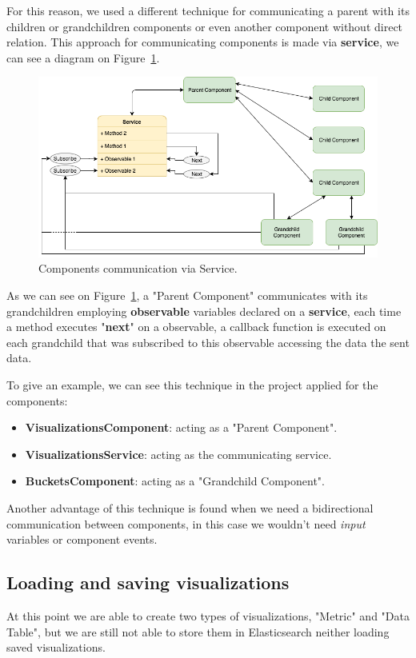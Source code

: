 \documentclass[a4paper, 12pt, english]{book}
\begin{document}
For this reason, we used a different technique for communicating a parent with its children or grandchildren components or even another component without direct relation. This approach for communicating components is made via \textbf{service}, we can see a diagram on Figure~\ref{fig:parent-child-via-service}.
\begin{figure}
  \centering
  \includegraphics[width=13cm, keepaspectratio]{img/parent-child-via-service.png}
  \caption{Components communication via Service.}
  \label{fig:parent-child-via-service}
\end{figure}

As we can see on Figure~\ref{fig:parent-child-via-service}, a "Parent Component" communicates with its grandchildren employing \textbf{observable} variables declared on a \textbf{service}, each time a method executes "\textbf{next}" on a observable, a callback function is executed on each grandchild that was subscribed to this observable accessing the data the sent data.

To give an example, we can see this technique in the project applied for the components:
\begin{itemize}
    \item \textbf{VisualizationsComponent}: acting as a "Parent Component".
    \item \textbf{VisualizationsService}: acting as the communicating service.
    \item \textbf{BucketsComponent}: acting as a "Grandchild Component".
\end{itemize}

Another advantage of this technique is found when we need a bidirectional communication between components, in this case we wouldn't need \textit{input} variables or component events.


\subsection{Loading and saving visualizations}
\label{sec:loading-and-saving}
At this point we are able to create two types of visualizations, "Metric" and "Data Table", but we are still not able to store them in Elasticsearch neither loading saved visualizations.
\end{document}
